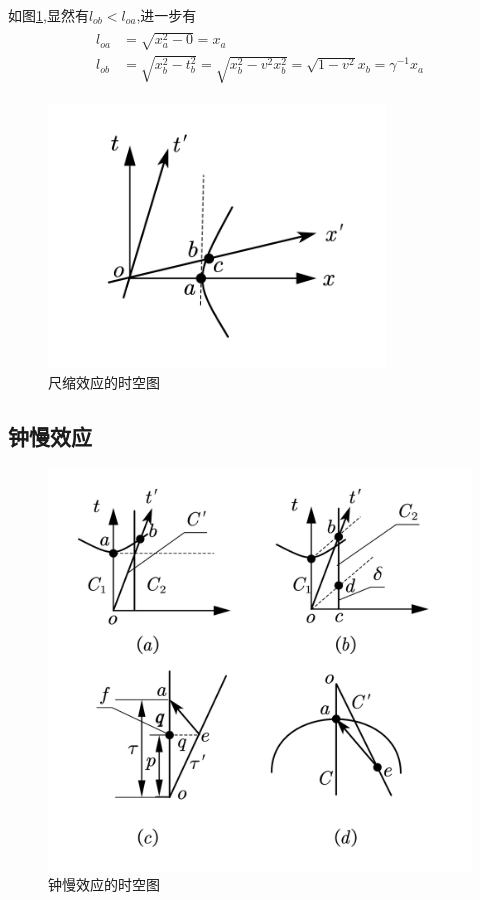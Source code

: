 如图\ref{fig:6-8},显然有$l_{ob}<l_{oa}$,进一步有
\begin{align}
\begin{aligned}
l_{oa}&=\sqrt{x_a^2-0}=x_a\\
l_{ob}&=\sqrt{x_b^2-t_b^2}=\sqrt{x_b^2-v^2x_b^2}=\sqrt{1-v^2}x_b=\gamma^{-1}x_a
\end{aligned}
\end{align}
\begin{figure}[htbp]
    \centering
    \includegraphics[width=0.8\textwidth]{Pictures/6-8.png}
    \caption{尺缩效应的时空图}
    \label{fig:6-8}
\end{figure}
\subsection{钟慢效应}
\begin{figure}[htbp]
    \centering
    \includegraphics[width=\textwidth]{Pictures/6-9.png}
    \caption{钟慢效应的时空图}
    \label{fig:6-9}
\end{figure}
